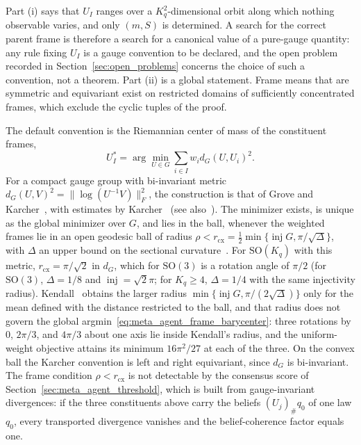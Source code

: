 Part (i) says that $U_I$ ranges over a $K_q^2$-dimensional orbit along which nothing observable varies, and only $(m, S)$ is determined. A search for the correct parent frame is therefore a search for a canonical value of a pure-gauge quantity: any rule fixing $U_I$ is a gauge convention to be declared, and the open problem recorded in Section~\ref{sec:open_problems} concerns the choice of such a convention, not a theorem. Part (ii) is a global statement. Frame means that are symmetric and equivariant exist on restricted domains of sufficiently concentrated frames, which exclude the cyclic tuples of the proof.

The default convention is the Riemannian center of mass of the constituent frames,
\begin{equation}
U_I^* = \arg\min_{U \in G} \sum_{i \in I} w_i d_G(U, U_i)^2.
\label{eq:meta_agent_frame_barycenter}
\end{equation}
For a compact gauge group with bi-invariant metric $d_G(U, V)^2 = \|\log(U^{-1}V)\|_F^2$, the construction is that of Grove and Karcher~\cite{GroveKarcher1973}, with estimates by Karcher~\cite{Karcher1977} (see also~\cite{Pennec2009}). The minimizer exists, is unique as the global minimizer over $G$, and lies in the ball, whenever the weighted frames lie in an open geodesic ball of radius $\rho < r_{\mathrm{cx}} = \tfrac12\min\{\operatorname{inj} G, \pi/\sqrt{\Delta}\}$, with $\Delta$ an upper bound on the sectional curvature~\cite[Thm.~2.1]{Afsari2011}. For $\mathrm{SO}(K_q)$ with this metric, $r_{\mathrm{cx}} = \pi/\sqrt{2}$ in $d_G$, which for $\mathrm{SO}(3)$ is a rotation angle of $\pi/2$ (for $\mathrm{SO}(3)$, $\Delta = 1/8$ and $\operatorname{inj} = \sqrt{2}\pi$; for $K_q \ge 4$, $\Delta = 1/4$ with the same injectivity radius). Kendall~\cite{Kendall1990} obtains the larger radius $\min\{\operatorname{inj} G, \pi/(2\sqrt{\Delta})\}$ only for the mean defined with the distance restricted to the ball, and that radius does not govern the global argmin~\eqref{eq:meta_agent_frame_barycenter}: three rotations by $0$, $2\pi/3$, and $4\pi/3$ about one axis lie inside Kendall's radius, and the uniform-weight objective attains its minimum $16\pi^2/27$ at each of the three. On the convex ball the Karcher convention is left and right equivariant, since $d_G$ is bi-invariant. The frame condition $\rho < r_{\mathrm{cx}}$ is not detectable by the consensus score of Section~\ref{sec:meta_agent_threshold}, which is built from gauge-invariant divergences: if the three constituents above carry the beliefs $(U_j)_\# q_0$ of one law $q_0$, every transported divergence vanishes and the belief-coherence factor equals one.

